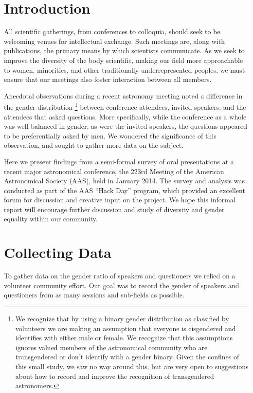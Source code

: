 \documentclass[iop]{emulateapj}
\begin{document}
\section{Introduction}
All scientific gatherings, from conferences to colloquia, should seek to be welcoming venues for intellectual exchange. Such meetings are, along with publications, the primary means by which scientists communicate. As we seek to improve the diversity of the body scientific, making our field more approachable to women, minorities, and other traditionally underrepresented peoples, we must ensure that our meetings also foster interaction between all members.

Anecdotal observations during a recent astronomy meeting noted a difference in the gender distribution%
\footnote{We recognize that by using a binary gender distribution as classified by volunteers we are making an assumption that everyone is cisgendered and identifies with either male or female. We recognize that this assumptions ignores valued members of the astronomical community who are transgendered or don't identify with a gender binary. Given the confines of this small study, we saw no way around this, but are very open to suggestions about how to record and improve the recognition of transgendered astronomers. } between conference attendees, invited speakers, and the attendees that asked questions. More specifically, while the conference as a whole was well balanced in gender, as were the invited speakers, the questions appeared to be preferentially asked by men. We wondered the significance of this observation, and sought to gather more data on the subject.


Here we present findings from a semi-formal survey of oral presentations at a recent major astronomical conference, the 223rd Meeting of the American Astronomical Society (AAS), held in January 2014. The survey and analysis was conducted as part of the AAS ``Hack Day'' program, which provided an excellent forum for discussion and creative input on the project. We hope this informal report will encourage further discussion and study of diversity and gender equality within our community.


\section{Collecting Data}
To gather data on the gender ratio of speakers and questioners we relied on a volunteer community effort. Our goal was to record the gender of speakers and questioners from as many sessions and sub-fields as possible. 
\end{document}
